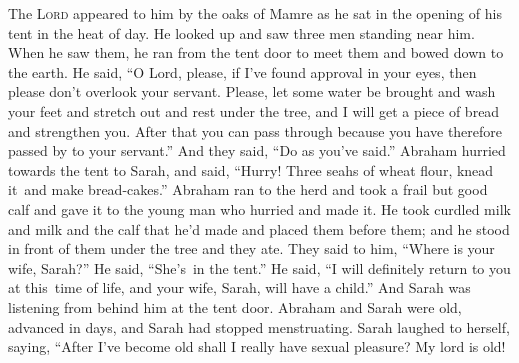 
\begin{inparaenum}
     The \textsc{Lord} appeared to him by the oaks of Mamre as he sat in the opening of his tent in the heat of day.%
     He looked up and saw three men standing near him. When he saw them, he ran from the tent door to meet them and bowed down to the earth.%
     He said, ``O Lord, please, if I've found approval in your eyes, then please don't overlook your servant.%
     Please, let some water be brought and wash your feet and stretch out and rest under the tree,%
     and I will get a piece of bread and strengthen you. After that you can pass through because you have therefore passed by to your servant.'' And they said, ``Do as you've said.''%
     Abraham hurried towards the tent to Sarah, and said, ``Hurry! Three seahs of wheat flour, knead it\understood\ and make bread-cakes.''%
     Abraham ran to the herd and took a frail but good calf and gave it to the young man who hurried and made it.%
     He took curdled milk and milk and the calf that he'd made and placed them before them; and he stood in front of them under the tree and they ate.%
     They said to him, ``Where is your wife, Sarah?'' He said, ``She's\understood\ in the tent.''%
     He said, ``I will definitely return to you at this\understood\ time of life, and your wife, Sarah, will have a child.'' And Sarah was listening from behind him at the tent door.%
     Abraham and Sarah were old, advanced in days, and Sarah had stopped menstruating.%
     Sarah laughed to herself, saying, ``After I've become old shall I really have sexual pleasure? My lord is old!%

\end{inparaenum}
